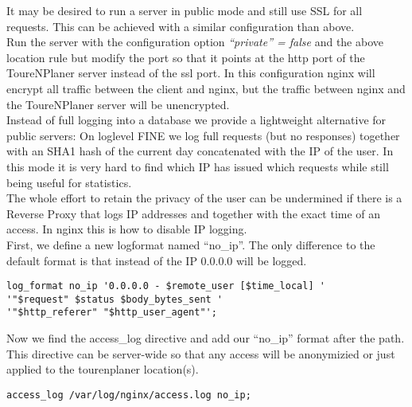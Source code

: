 \documentclass[ngerman,titlepage,parskip=true]{scrartcl}
\begin{document}
It may be desired to run a server in public mode and still use SSL for all requests. This can be achieved with a similar configuration than above.\\
Run the server with the configuration option \textit{``private'' = false} and the above location rule but modify the port so that it points at the http port of the ToureNPlaner server instead of the ssl port.
In this configuration nginx will encrypt all traffic between the client and nginx, but the traffic between nginx and the ToureNPlaner server will be unencrypted.\\
Instead of full logging into a database we provide a lightweight alternative for public servers: On loglevel FINE we log full requests (but no responses) together with an SHA1 hash of the current day concatenated with the IP of the user. In this mode it is very hard to find which IP has issued which requests while still being useful for statistics.\\
The whole effort to retain the privacy of the user can be undermined if there is a Reverse Proxy that logs IP addresses and together with the exact time of an access. In nginx this is how to disable IP logging.\\
First, we define a new logformat named ``no\_ip''. The only difference to the default format is that instead of the IP 0.0.0.0 will be logged.
\begin{lstlisting}
log_format no_ip '0.0.0.0 - $remote_user [$time_local] '
'"$request" $status $body_bytes_sent '
'"$http_referer" "$http_user_agent"';
\end{lstlisting}
Now we find the access\_log directive and add our ``no\_ip'' format after the path. This directive can be server-wide so that any access will be anonymizied or just applied to the tourenplaner location(s).
\begin{lstlisting}
access_log /var/log/nginx/access.log no_ip;
\end{lstlisting}
\end{document}
